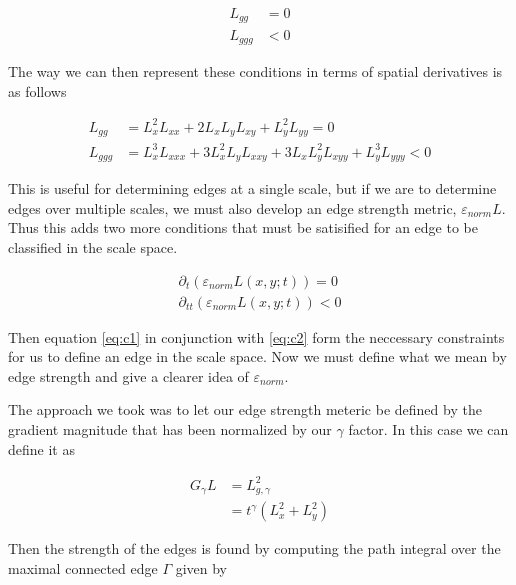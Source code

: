 \documentclass{article}
\begin{document}
\begin{equation} \label{eq:c1}
  \begin{aligned}
    L_{gg} &= 0 \\
    L_{ggg} &< 0
  \end{aligned}
\end{equation}

The way we can then represent these conditions in terms of spatial derivatives is as follows

\begin{equation}
  \begin{aligned}
    L_{gg} &= L_x^2L_{xx}+2L_xL_yL_{xy}+L_y^2L_{yy} = 0 \\
    L_{ggg} &= L_x^3L_{xxx} +3L_x^2L_yL_{xxy}+3L_xL_y^2L_{xyy}+L_y^3L_{yyy} < 0
  \end{aligned}
\end{equation}

This is useful for determining edges at a single scale, but if we are to determine edges over multiple scales, we must also develop an edge strength metric, $\varepsilon_{norm}L$.
Thus this adds two more conditions that must be satisified for an edge to be classified in the scale space. 

\begin{equation} \label{eq:c2}
  \begin{aligned}
    \partial_t(\varepsilon_{norm}L(x,y;t)) = 0\\
    \partial_{tt}(\varepsilon_{norm}L(x,y;t)) < 0
  \end{aligned}
\end{equation}

Then equation \ref{eq:c1} in conjunction with \ref{eq:c2} form the neccessary constraints for us to define an edge in the scale space.
Now we must define what we mean by edge strength and give a clearer idea of $\varepsilon_{norm}$.

The approach we took was to let our edge strength meteric be defined by the gradient magnitude that has been normalized by our $\gamma$ factor.
In this case we can define it as 

\begin{equation}
  \begin{aligned}
    G_{\gamma}L &= L_{g,\gamma}^2 \\
    &= t^{\gamma}(L_x^2+L_y^2)
  \end{aligned}
\end{equation}

Then the strength of the edges is found by computing the path integral over the maximal connected edge $\Gamma$ given by
\end{document}
